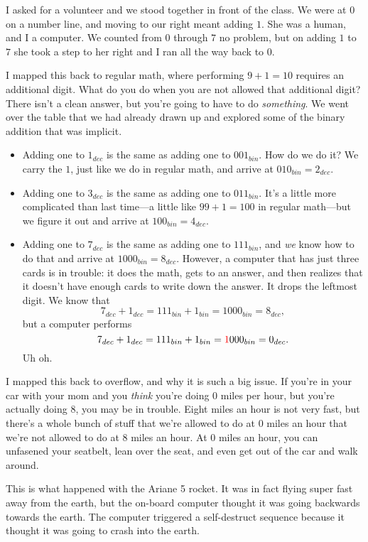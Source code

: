 \documentclass[sigplan]{acmart}
\begin{document}
I asked for a volunteer and we stood together in front of the class.
We were at $0$ on a number line, and moving to our right meant adding $1$.
She was a human, and I a computer.
We counted from $0$ through $7$ no problem, but on adding $1$ to $7$ she took a step to her right and I ran all the way back to $0$.

I mapped this back to regular math, where performing $9 + 1 = 10$ requires an additional digit.
What do you do when you are not allowed that additional digit?
There isn't a clean answer, but you're going to have to do \emph{something}.
We went over the table that we had already drawn up and explored some of the binary addition that was implicit.
\begin{itemize}
  \item
  Adding one to $1_{dec}$ is the same as adding one to $001_{bin}$.
  How do we do it? We carry the $1$, just like we do in regular math, and arrive at $010_{bin} = 2_{dec}$.

  \item
  Adding one to $3_{dec}$ is the same as adding one to $011_{bin}$.
  It's a little more complicated than last time---a little like $99+1 = 100$ in regular math---but we figure it out and arrive at $100_{bin} = 4_{dec}$.

  \item
  Adding one to $7_{dec}$ is the same as adding one to $111_{bin}$, and \emph{we} know how to do that and arrive at $1000_{bin} = 8_{dec}$.
  However, a computer that has just three cards is in trouble: it does the math, gets to an answer, and then realizes that it doesn't have enough cards to write down the answer.
  It drops the leftmost digit.
  We know that
  $$7_{dec} + 1_{dec} = 111_{bin} + 1_{bin} = 1000_{bin} = 8_{dec},$$
  but a computer performs
  $$7_{dec} + 1_{dec} = 111_{bin} + 1_{bin} = {\color{red}1}000_{bin} = 0_{dec}.$$
  Uh oh.
\end{itemize}

I mapped this back to overflow, and why it is such a big issue.
If you're in your car with your mom and you \emph{think} you're doing $0$ miles per hour, but you're actually doing $8$, you may be in trouble.
Eight miles an hour is not very fast, but there's a whole bunch of stuff that we're allowed to do at $0$ miles an hour that we're not allowed to do at $8$ miles an hour.
At $0$ miles an hour, you can unfasened your seatbelt, lean over the seat, and even get out of the car and walk around.

This is what happened with the Ariane 5 rocket.
It was in fact flying super fast away from the earth, but the on-board computer thought it was going backwards towards the earth.
The computer triggered a self-destruct sequence because it thought it was going to crash into the earth.
\end{document}

